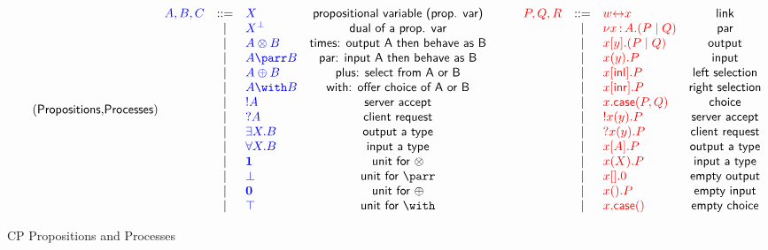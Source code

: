 \begin{figure*}
\begin{gather*}
\colored
  \tag{\key{Propositions},\key{Processes}}
  \begin{array}{rclc}
    \tp{A,B,C} & \bnf & \tp{X} & \key{propositional variable (prop. var)}\\
          & \alt & \tp{\dualbt{X}} & \key{dual of a prop. var}\\
          & \alt & \tp{A \otimes B} & \key{times: output A then behave as B}\\
          & \alt & \tp{A \parr B} & \key{par: input A then behave as B}\\
          & \alt & \tp{A \oplus B} & \key{plus: select from A or B}\\
          & \alt & \tp{A \with B} & \key{with: offer choice of A or B}\\
          & \alt & \tp{! A} & \key{server accept}\\
          & \alt & \tp{? A} & \key{client request}\\
          & \alt & \tp{\exists X . B} & \key{output a type}\\
          & \alt & \tp{\forall X . B} & \key{input a type}\\
          & \alt & \tp{\1} & \key{unit for $\otimes$}\\
          & \alt & \tp{\bot} & \key{unit for $\parr$}\\
          & \alt & \tp{\0} & \key{unit for $\oplus$}\\
          & \alt & \tp{\top} & \key{unit for $\with$}
  \end{array}
  \qquad
  \begin{array}{rclc}
    \tm{P,Q,R} & \bnf & \tm{w \link x} & \key{link}\\
          & \alt & \tm{\nu x \of{A}.(P \mid Q)} & \key{par}\\
          & \alt & \tm{x[y].(P \mid Q)} & \key{output}\\
          & \alt & \tm{x(y).P} & \key{input}\\
          & \alt & \tm{x[\inlterm].P} & \key{left selection}\\
          & \alt & \tm{x[\inrterm].P} & \key{right selection}\\
          & \alt & \tm{x.\caseterm(P,Q)} & \key{choice}\\
          & \alt & \tm{!x(y).P} & \key{server accept}\\
          & \alt & \tm{?x(y).P} & \key{client request}\\
          & \alt & \tm{x[A].P} & \key{output a type}\\
          & \alt & \tm{x(X).P} & \key{input a type}\\
          & \alt & \tm{x[].0} & \key{empty output}\\
          & \alt & \tm{x().P} & \key{empty input}\\
          & \alt & \tm{x.\caseterm()} & \key{empty choice}
  \end{array}
\end{gather*}
\caption{CP Propositions and Processes}
\label{fig:cptnts}
\end{figure*}
